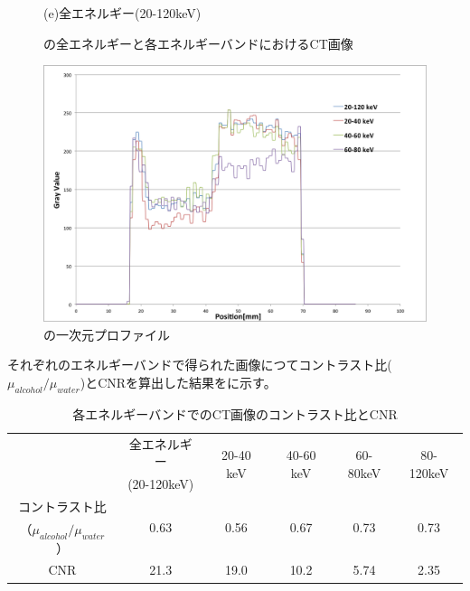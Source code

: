 \begin{figure}[H]
\begin{minipage}{0.5\hsize}
\begin{center}
  \end{center}  
\vspace{-1cm}
\caption*{(e)全エネルギー(20-120keV)}
 \end{minipage}
 \begin{center}
  \caption{の全エネルギーと各エネルギーバンドにおけるCT画像}
  \label{fig:low_contrast_multi}
  \end{center}
\end{figure}


\begin{figure}[H]
 \begin{center}
 \includegraphics[bb=0.000000 0.000000 752.097827 504.438300,width=0.7\hsize]{image2/chapter5/Low_Con_slice.png} 
 \end{center}
 \caption{の一次元プロファイル}
 \label{fig:Low_Con_slice}
\end{figure}


それぞれのエネルギーバンドで得られた画像につてコントラスト比($\mu_{alcohol}/\mu_{water}$)とCNRを算出した結果をに示す。
\begin{table}[H]
  \centering
    \begin{tabular}{cccccc}
    \toprule
    \multirow{2}[2]{*}{} & 全エネルギー & \multirow{2}[2]{*}{20-40 keV} & \multirow{2}[2]{*}{40-60 keV} & \multirow{2}[2]{*}{60-80keV} & \multirow{2}[2]{*}{80-120keV} \\
          & (20-120keV) &       &       &       &  \\
    \midrule
    コントラスト比 & \multirow{2}[1]{*}{0.63} & \multirow{2}[1]{*}{0.56} & \multirow{2}[1]{*}{0.67} & \multirow{2}[1]{*}{0.73} & \multirow{2}[1]{*}{0.73} \\
    （$\mu_{alcohol}/\mu_{water}$） &       &       &       &       &  \\
    CNR   & 21.3  & 19.0    & 10.2  & 5.74  & 2.35 \\
    \bottomrule
    \end{tabular}%
      \caption{各エネルギーバンドでのCT画像のコントラスト比とCNR}
  \label{tab:low_contrast}%
\end{table}%


